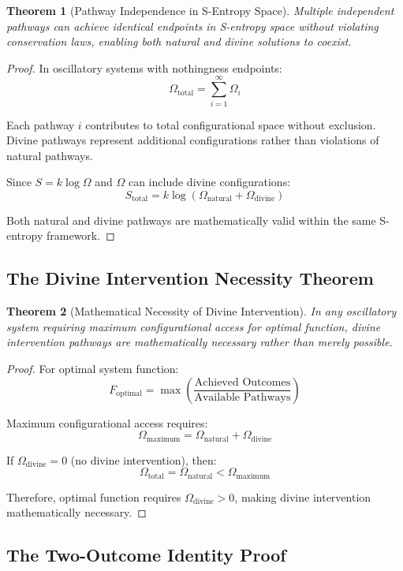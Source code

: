 \documentclass[12pt,a4paper]{article}
\newtheorem{theorem}{Theorem}[section]
\begin{document}
\begin{theorem}[Pathway Independence in S-Entropy Space]
Multiple independent pathways can achieve identical endpoints in S-entropy space without violating conservation laws, enabling both natural and divine solutions to coexist.
\end{theorem}

\begin{proof}
In oscillatory systems with nothingness endpoints:
$$\Omega_{\text{total}} = \sum_{i=1}^{\infty} \Omega_i$$

Each pathway $i$ contributes to total configurational space without exclusion. Divine pathways represent additional configurations rather than violations of natural pathways.

Since $S = k \log \Omega$ and $\Omega$ can include divine configurations:
$$S_{\text{total}} = k \log\left(\Omega_{\text{natural}} + \Omega_{\text{divine}}\right)$$

Both natural and divine pathways are mathematically valid within the same S-entropy framework.
\end{proof}

\subsection{The Divine Intervention Necessity Theorem}

\begin{theorem}[Mathematical Necessity of Divine Intervention]
In any oscillatory system requiring maximum configurational access for optimal function, divine intervention pathways are mathematically necessary rather than merely possible.
\end{theorem}

\begin{proof}
For optimal system function:
$$F_{\text{optimal}} = \max \left(\frac{\text{Achieved Outcomes}}{\text{Available Pathways}}\right)$$

Maximum configurational access requires:
$$\Omega_{\text{maximum}} = \Omega_{\text{natural}} + \Omega_{\text{divine}}$$

If $\Omega_{\text{divine}} = 0$ (no divine intervention), then:
$$\Omega_{\text{total}} = \Omega_{\text{natural}} < \Omega_{\text{maximum}}$$

Therefore, optimal function requires $\Omega_{\text{divine}} > 0$, making divine intervention mathematically necessary.
\end{proof}

\subsection{The Two-Outcome Identity Proof}
\end{document}
